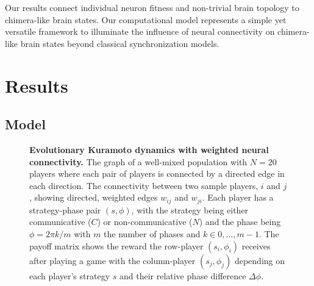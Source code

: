 \documentclass[pdflatex,lineno,referee,sn-nature]{sn-jnl}
\begin{document}
Our results connect individual neuron fitness and non-trivial brain topology
to chimera-like brain states.
Our computational model represents a simple yet versatile framework
to illuminate the influence of neural connectivity on chimera-like brain states
beyond classical synchronization models.

\section{Results}\label{sec:results}

\subsection{Model}
\begin{figure*}
  \centering
  \begin{nomemoize} %
    \begin{subcaptiongroup}
        {\label{fig:payoff_matrix}\captiontext*{}}{%
        {\label{fig:player_interactions}\captiontext*{}}{%
        {\label{fig:graph_well-mixed}\captiontext*{}}{%
      {}%
    }}}
    \end{subcaptiongroup}
  \end{nomemoize}
  \caption{
    \textbf{
      Evolutionary Kuramoto dynamics with weighted neural connectivity.
    }
    The graph of a well-mixed population with $N=20$ players
    where each pair of players is connected by a directed edge in each direction.
    The connectivity between two sample players, $i$ and $j$,
    showing directed, weighted edges $w_{ij}$ and $w_{ji}$.
    Each player has a strategy-phase pair $(s, \phi)$,
    with the strategy being either communicative ($C$) or non-communicative ($N$)
    and the phase being $\phi = 2\pi k/m$ with $m$ the number of phases
    and $k \in 0,\ldots,m-1$.
    The payoff matrix shows the reward the row-player $(s_i, \phi_i)$
    receives after playing a game with the column-player $(s_j, \phi_j)$
    depending on each player's strategy $s$ and
    their relative phase difference $\Delta \phi$.
  }\label{fig:connectivity}
\end{figure*}
\end{document}
